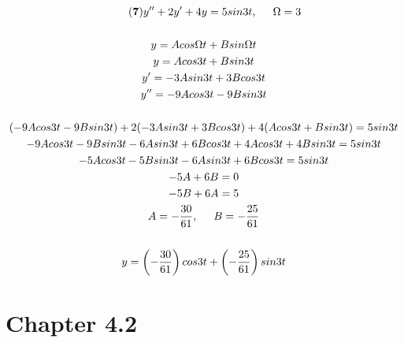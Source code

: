 \documentclass{article}
\begin{document}
\begin{gather*}\tag{\textbf{7}}
    y''+2y'+4y=5sin3t, \hspace{.5cm} \Omega=3\\\\
    y = Acos\Omega t + Bsin\Omega t\\
    y = Acos3t + Bsin3t\\
    y' = -3Asin3t + 3Bcos3t\\
    y'' = -9Acos3t - 9Bsin3t\\\\
    (-9Acos3t-9Bsin3t)+2(-3Asin3t+3Bcos3t)+4(Acos3t+Bsin3t) = 5sin3t\\
    -9Acos3t-9Bsin3t-6Asin3t+6Bcos3t+4Acos3t+4Bsin3t=5sin3t\\
    -5Acos3t-5Bsin3t-6Asin3t+6Bcos3t = 5sin3t\\
    -5A+6B=0\\
    -5B+6A = 5\\
    A = -\frac{30}{61},\hspace{.5cm}
    B = -\frac{25}{61}\\\\
    y = \left(-\frac{30}{61}\right)cos3t+\left(-\frac{25}{61}\right)sin3t
\end{gather*}
\newpage\section*{Chapter 4.2}
\end{document}
